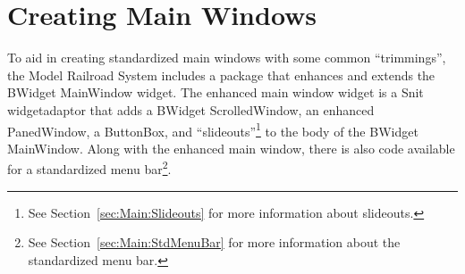 
\chapter{Creating Main Windows}
\label{chapt:MainWindows}

To aid in creating standardized main windows with some common
``trimmings'', the Model Railroad System includes a package that
enhances and extends the BWidget MainWindow widget.  The enhanced main
window widget is a Snit widgetadaptor that adds a BWidget
ScrolledWindow, an enhanced PanedWindow, a ButtonBox, and
``slideouts''\footnote{See Section~\ref{sec:Main:Slideouts} for more
information about slideouts.} to the body of the BWidget MainWindow. 
Along with the enhanced main window, there is also code available for a
standardized menu bar\footnote{See Section~\ref{sec:Main:StdMenuBar} for
more information about the standardized menu bar.}.

